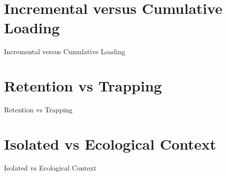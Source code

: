 \documentclass[bigger]{beamer}
\begin{document}

\section{Incremental versus Cumulative Loading}
\begin{frame}{Incremental versus Cumulative Loading}
  \begin{center}
    \incrementalcumulativeloads[1.1]
  \end{center}
\end{frame}


\section{Retention vs Trapping}
\begin{frame}{Retention vs Trapping}
  \begin{center}
    \retentiontrapping[1.1]
  \end{center}
\end{frame}


\section{Isolated vs Ecological Context}
\begin{frame}{Isolated vs Ecological Context}

  \begin{minipage}[b]{0.28\paperwidth}
    \isolated[0.96]
    \vspace{0.7em}
  \end{minipage}
  \begin{minipage}[b]{0.22\paperwidth}
    \secondary[1.3]
  \end{minipage}
  \begin{minipage}[b]{0.24\paperwidth}
    \secondarypluswatershed[1.3]
  \end{minipage}
  
\end{frame}

\end{document}
